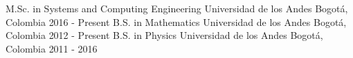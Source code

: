 

\begin{cventries}

\vspace{-1cm}
\cventry{}{}{}{}{}
\noindent
\cventry
{M.Sc. in Systems and Computing Engineering} %
{Universidad de los Andes} %
{Bogotá, Colombia} %
{2016 - Present} %
{}
\cventry
{B.S. in Mathematics} %
{Universidad de los Andes} %
{Bogotá, Colombia} %
{2012 - Present} %
{}
\cventry
{B.S. in Physics} %
{Universidad de los Andes} %
{Bogotá, Colombia} %
{2011 - 2016} %
{}

\vspace{-0.5cm}
\end{cventries}
